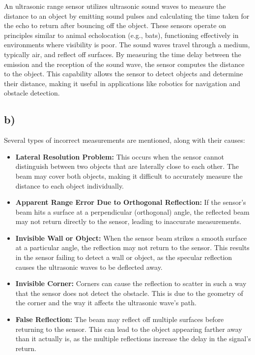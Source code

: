\documentclass[template,12pt,a4paper,enabledeprecatedfontcommands]{template}
\begin{document}
An ultrasonic range sensor utilizes ultrasonic sound waves to measure the distance to an object by emitting sound pulses and calculating the time taken for the echo to return after bouncing off the object. These sensors operate on principles similar to animal echolocation (e.g., bats), functioning effectively in environments where visibility is poor. The sound waves travel through a medium, typically air, and reflect off surfaces. By measuring the time delay between the emission and the reception of the sound wave, the sensor computes the distance to the object. This capability allows the sensor to detect objects and determine their distance, making it useful in applications like robotics for navigation and obstacle detection.

\subsection{b)}

Several types of incorrect measurements are mentioned, along with their causes:

\begin{itemize}
    \item \textbf{Lateral Resolution Problem:} 
    This occurs when the sensor cannot distinguish between two objects that are laterally close to each other. The beam may cover both objects, making it difficult to accurately measure the distance to each object individually.
    
    \item \textbf{Apparent Range Error Due to Orthogonal Reflection:} 
    If the sensor's beam hits a surface at a perpendicular (orthogonal) angle, the reflected beam may not return directly to the sensor, leading to inaccurate measurements.
    
    \item \textbf{Invisible Wall or Object:} 
    When the sensor beam strikes a smooth surface at a particular angle, the reflection may not return to the sensor. This results in the sensor failing to detect a wall or object, as the specular reflection causes the ultrasonic waves to be deflected away.
    
    \item \textbf{Invisible Corner:} 
    Corners can cause the reflection to scatter in such a way that the sensor does not detect the obstacle. This is due to the geometry of the corner and the way it affects the ultrasonic wave's path.
    
    \item \textbf{False Reflection:} 
    The beam may reflect off multiple surfaces before returning to the sensor. This can lead to the object appearing farther away than it actually is, as the multiple reflections increase the delay in the signal's return.
\end{itemize}
\end{document}
